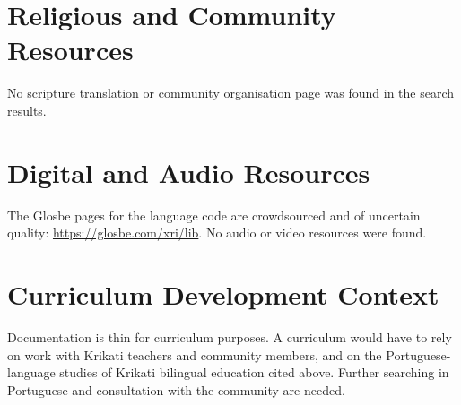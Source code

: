 \documentclass[12pt]{article}
\begin{document}
\section{Religious and Community Resources}
No scripture translation or community organisation page was found in the search results.

\section{Digital and Audio Resources}
The Glosbe pages for the language code are crowdsourced and of uncertain quality: \url{https://glosbe.com/xri/lib}. No audio or video resources were found.

\section{Curriculum Development Context}
Documentation is thin for curriculum purposes. A curriculum would have to rely on work with Krikati teachers and community members, and on the Portuguese-language studies of Krikati bilingual education cited above. Further searching in Portuguese and consultation with the community are needed.
\end{document}

